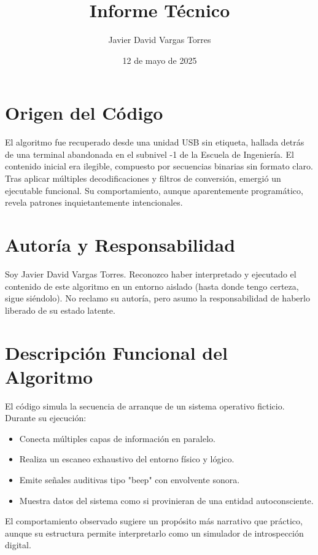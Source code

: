 \documentclass[12pt]{article}
\title{Informe Técnico}
\author{Javier David Vargas Torres}
\date{12 de mayo de 2025}
\begin{document}
\maketitle

\newpage
\section*{Origen del Código}

El algoritmo fue recuperado desde una unidad USB sin etiqueta, hallada detrás de una terminal abandonada en el subnivel -1 de la Escuela de Ingeniería. El contenido inicial era ilegible, compuesto por secuencias binarias sin formato claro. Tras aplicar múltiples decodificaciones y filtros de conversión, emergió un ejecutable funcional. Su comportamiento, aunque aparentemente programático, revela patrones inquietantemente intencionales.

\section*{Autoría y Responsabilidad}

Soy Javier David Vargas Torres. Reconozco haber interpretado y ejecutado el contenido de este algoritmo en un entorno aislado (hasta donde tengo certeza, sigue siéndolo). No reclamo su autoría, pero asumo la responsabilidad de haberlo liberado de su estado latente.

\section*{Descripción Funcional del Algoritmo}

El código simula la secuencia de arranque de un sistema operativo ficticio. Durante su ejecución:
\begin{itemize}
    \item Conecta múltiples capas de información en paralelo.
    \item Realiza un escaneo exhaustivo del entorno físico y lógico.
    \item Emite señales auditivas tipo "beep" con envolvente sonora.
    \item Muestra datos del sistema como si provinieran de una entidad autoconsciente.
\end{itemize}

El comportamiento observado sugiere un propósito más narrativo que práctico, aunque su estructura permite interpretarlo como un simulador de introspección digital.
\end{document}
